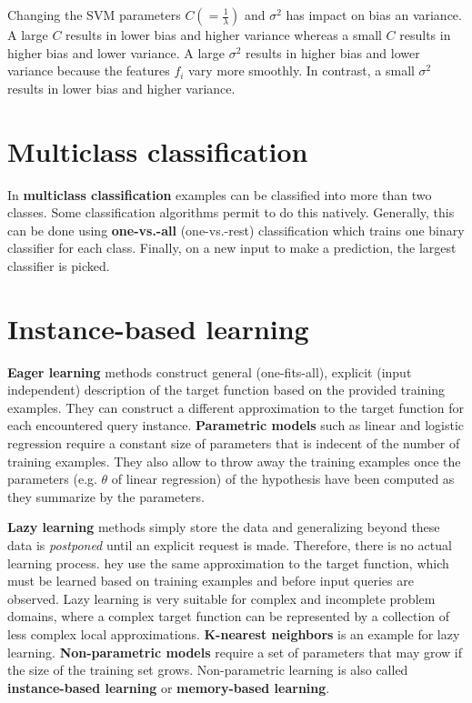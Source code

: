 \documentclass{report}
\begin{document}
Changing the SVM parameters $C(=\frac{1}{\lambda})$ and $\sigma^2$ has impact on bias an variance.  A large $C$ results in lower bias and higher variance whereas a small $C$ results in higher bias and lower variance. A large $\sigma^2$ results in higher bias and lower variance because the features $f_i$ vary more smoothly. In contrast, a small $\sigma^2$ results in lower bias and higher variance.

\section{Multiclass classification}
In {\bf multiclass classification} examples can be classified into more than two classes. Some classification algorithms permit to do this natively. Generally, this can be done using {\bf one-vs.-all} (one-vs.-rest) classification which trains one binary classifier for each class. Finally, on a new input to make a prediction, the largest classifier is picked.

\section{Instance-based learning}
{\bf Eager learning} methods construct general (one-fits-all), explicit (input independent) description of the target function based on the provided training examples. They can construct a different approximation to the target function for each encountered query instance.
{\bf Parametric models} such as linear and logistic regression require a constant size of parameters that is indecent of the number of training examples. They also allow to throw away the training examples once the parameters (e.g. $\theta$ of linear regression) of the hypothesis have been computed as they summarize by the parameters.

{\bf Lazy learning} methods simply store the data and generalizing beyond these data is {\em postponed} until an explicit request is made. Therefore, there is no actual learning process.
 hey use the same approximation to the target function, which must be learned based on training examples and before input queries are observed.
Lazy learning is very suitable for complex and incomplete problem domains, where a complex target function can be represented by a collection of less complex local approximations.
{\bf K-nearest neighbors} is an example for lazy learning.
{\bf Non-parametric models} require a set of parameters that may grow if the size of the training set grows. Non-parametric learning is also called {\bf instance-based learning} or {\bf memory-based learning}.
\end{document}
